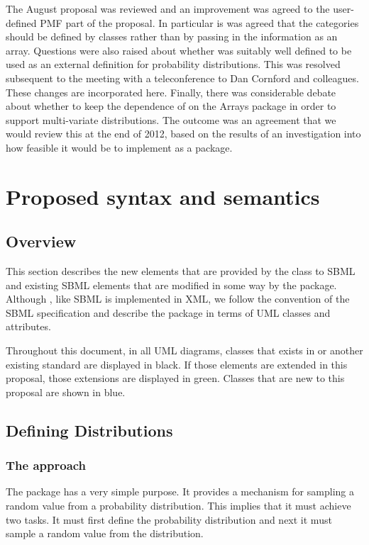 \documentclass[draftspec]{sbmlpkgspec}
\begin{document}
The August proposal was reviewed and an improvement was agreed to
the user-defined PMF part of the proposal. In particular is was agreed
that the categories should be defined by \distribshort classes rather
than by passing in the information as an array. Questions were also raised
about whether \uncertml was suitably well defined to be used as an
external definition for probability distributions. This was resolved
subsequent to the meeting with a teleconference to Dan Cornford and
colleagues. These changes are incorporated here. Finally, there was
considerable debate about whether to keep the dependence of
\distribshort on the Arrays package in order to support multi-variate
distributions. The outcome was an agreement that we would review this
at the end of 2012, based on the results of an investigation
into how feasible it would be to implement \arrays as a package.

\section{Proposed syntax and semantics}

\subsection{Overview}

This section describes the new elements that are provided by the class
to SBML and existing SBML elements that are modified in some way by
the package. Although \distribshort, like SBML is implemented in XML,
we follow the convention of the SBML specification and describe the
package in terms of UML classes and attributes.

Throughout this document, in all UML diagrams, classes that exists in
\sbmlverone or another existing standard are displayed in
black. If those elements are extended in this proposal, those
extensions are displayed in green. Classes that are new to this
proposal are shown in blue.

\subsection{Defining Distributions}

\subsubsection{The approach}

The \distrib package has a very simple purpose. It provides a
mechanism for sampling a random value from a probability
distribution. This implies that it must achieve two tasks. It must
first define the probability distribution and next it must sample a
random value from the distribution.
\end{document}
